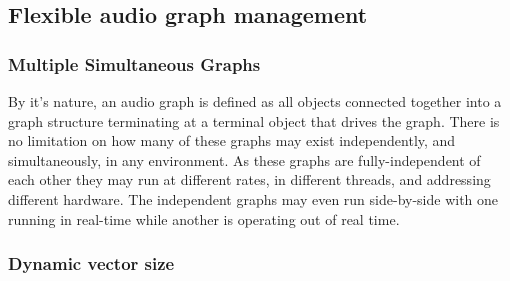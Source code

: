 \documentclass[twoside,a4paper]{article}
\begin{document}


%   



\subsection{Flexible audio graph management} %

\subsubsection{Multiple Simultaneous Graphs} %

By it's nature, an audio graph is defined as all objects connected together into a graph structure terminating at a terminal object that drives the graph.  
There is no limitation on how many of these graphs may exist independently, and simultaneously, in any environment.  
As these graphs are fully-independent of each other they may run at different rates, in different threads, and addressing different hardware.  The independent graphs may even run side-by-side with one running in real-time while another is operating out of real time.



\subsubsection{Dynamic vector size} %

\end{document}
